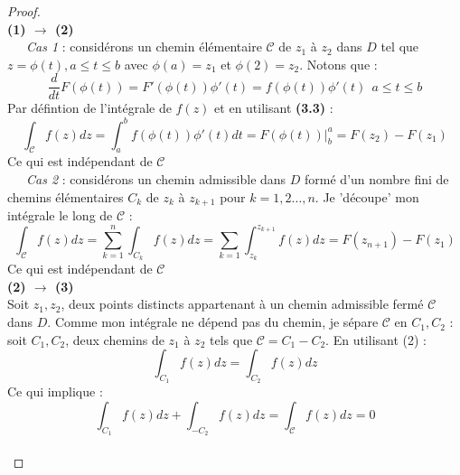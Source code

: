 \newpage
\begin{proof}\ \\
	\textbf{(1) $\rightarrow$ (2)}\\
	\ \ \ \textit{Cas 1} : considérons un chemin élémentaire $\mathcal{C}$ de $z_1$ à
	$z_2$ dans $D$ tel que $z = \phi(t), a\leq t\leq b$ avec $\phi(a) = z_1$ et $\phi(
	2) = z_2$. Notons que : 
	\begin{equation}
		\frac{d}{dt}F(\phi(t)) = F'(\phi(t))\phi'(t) = f(\phi(t))\phi'(t)\ \ a \leq t\leq b
	\end{equation}
	Par défintion de l'intégrale de $f(z)$ et en utilisant \textbf{(3.3)} :
	\begin{equation}
		\int_\mathcal{C} f(z) dz = \int_a^b f(\phi(t))\phi'(t) dt = F(\phi(t))|_b^a = F(z_2)
		- F(z_1)
	\end{equation}
	Ce qui est indépendant de $\mathcal{C}$\\
	    
	\ \ \ \textit{Cas 2} : considérons un chemin admissible dans $D$ formé d'un nombre
	fini de chemins élémentaires $C_k$ de $z_k$ à $z_{k+1}$ pour $k=1,2\dots,n.$ Je
	'découpe' mon intégrale le long de $\mathcal{C}$ :
	\begin{equation}
		\int_\mathcal{C} f(z) dz = \sum_{k=1}^n \int_{C_k} f(z)dz = \sum_{k=1} \int_{z_k}^{z_{k+1}}
		f(z)dz = F(z_{n+1}) - F(z_1)
	\end{equation}
	Ce qui est indépendant de $\mathcal{C}$\\
	    
	\textbf{(2) $\rightarrow$ (3)}\\
	Soit $z_1,z_2$, deux points distincts appartenant à un chemin admissible fermé 
	$\mathcal{C}$ dans $D$. Comme mon intégrale ne dépend pas du chemin, je sépare
	$\mathcal{C}$ en $C_1,C_2$ : soit $C_1,C_2$, deux chemins de $z_1$ à $z_2$ tels
	que $\mathcal{C} = C_1-C_2$. En utilisant (2) :
	\begin{equation}
		\int_{C_1} f(z) dz = \int_{C_2} f(z) dz
	\end{equation}
	Ce qui implique : 
	\begin{equation}
		\int_{C_1} f(z) dz + \int_{-C_2} f(z) dz = \int_\mathcal{C}f(z) dz = 0
	\end{equation}\ \\
	    

\end{proof}
